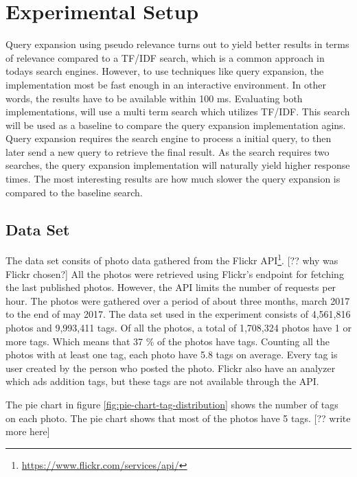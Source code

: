 \section{Experimental Setup}
Query expansion using pseudo relevance turns out to yield better results in terms of relevance compared to a TF/IDF search,
which is a common approach in todays search engines.
However, to use techniques like query expansion,
the implementation most be fast enough in an interactive environment.
In other words, the results have to be available within 100 ms.
Evaluating both implementations,
will use a multi term search which utilizes TF/IDF.
This search will be used as a baseline to compare the query expansion implementation agins.
Query expansion requires the search engine to process a initial query,
to then later send a new query to retrieve the final result.
As the search requires two searches,
the query expansion implementation will naturally yield higher response times.
The most interesting results are how much slower the query expansion is compared to the baseline search.

\subsection{Data Set}
\label{sec:dataset}
The data set consits of photo data gathered from the Flickr API\footnote{\url{https://www.flickr.com/services/api/}}.
[?? why was Flickr chosen?]
All the photos were retrieved using Flickr's endpoint for fetching the last published photos.
However, the API limits the number of requests per hour.
The photos were gathered over a period of about three months, march 2017 to the end of may 2017.
The data set used in the experiment consists of 4,561,816 photos and 9,993,411 tags.
Of all the photos, a total of 1,708,324 photos have 1 or more tags.
Which means that 37 \% of the photos have tags.
Counting all the photos with at least one tag,
each photo have 5.8 tags on average.
Every tag is user created by the person who posted the photo.
Flickr also have an analyzer which ads addition tags,
but these tags are not available through the API.

The pie chart in figure \ref{fig:pie-chart-tag-distribution} shows the number of tags on each photo.
The pie chart shows that most of the photos have 5 tags.
[?? write more here]

